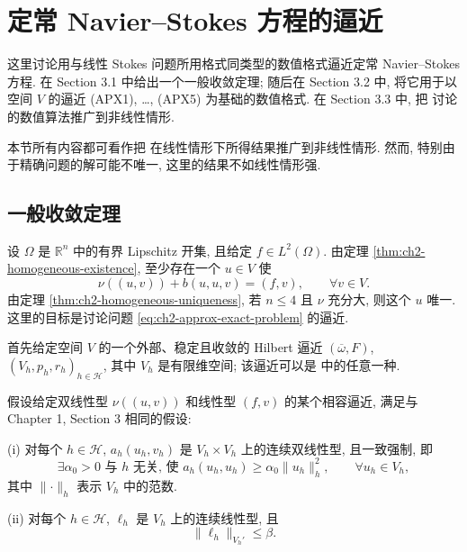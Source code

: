 \hypertarget{chapter-02-page-149}{}
\section{定常 Navier--Stokes 方程的逼近}
\label{sec:ch2-stationary-approximation}

这里讨论用与线性 Stokes 问题所用格式同类型的数值格式逼近定常 Navier--Stokes 方程. 在 Section 3.1 中给出一个一般收敛定理; 随后在 Section 3.2 中, 将它用于以空间 $V$ 的逼近 (APX1), \ldots, (APX5) 为基础的数值格式. 在 Section 3.3 中, 把  讨论的数值算法推广到非线性情形.

本节所有内容都可看作把  在线性情形下所得结果推广到非线性情形. 然而, 特别由于精确问题的解可能不唯一, 这里的结果不如线性情形强.

\subsection{一般收敛定理}
\label{subsec:ch2-general-convergence}

设 $\Omega$ 是 $\mathbb R^n$ 中的有界 Lipschitz 开集, 且给定 $f\in L^2(\Omega)$. 由定理 \ref{thm:ch2-homogeneous-existence}, 至少存在一个 $u\in V$ 使
\begin{equation}
\nu((u,v))+b(u,u,v)=(f,v),\qquad\forall v\in V.
\label{eq:ch2-approx-exact-problem}
\end{equation}
由定理 \ref{thm:ch2-homogeneous-uniqueness}, 若 $n\leq4$ 且 $\nu$ 充分大, 则这个 $u$ 唯一. 这里的目标是讨论问题 \eqref{eq:ch2-approx-exact-problem} 的逼近.

首先给定空间 $V$ 的一个外部、稳定且收敛的 Hilbert 逼近 $(\overline\omega,F)$, $(V_h,p_h,r_h)_{h\in\mathcal H}$, 其中 $V_h$ 是有限维空间; 该逼近可以是  中的任意一种.

假设给定双线性型 $\nu((u,v))$ 和线性型 $(f,v)$ 的某个相容逼近, 满足与 Chapter 1, Section 3 相同的假设:

(i) 对每个 $h\in\mathcal H$, $a_h(u_h,v_h)$ 是 $V_h\times V_h$ 上的连续双线性型, 且一致强制, 即
\begin{equation}
\exists\alpha_0>0\text{ 与 }h\text{ 无关, 使 }
a_h(u_h,u_h)\geq\alpha_0\lVert u_h\rVert_h^2,
\qquad\forall u_h\in V_h,
\label{eq:ch2-approx-uniform-coercivity}
\end{equation}
其中 $\lVert\cdot\rVert_h$ 表示 $V_h$ 中的范数.

(ii) 对每个 $h\in\mathcal H$, $\ell_h$ 是 $V_h$ 上的连续线性型, 且
\begin{equation}
\lVert\ell_h\rVert_{V_h'}\leq\beta.
\label{eq:ch2-approx-load-bound}
\end{equation}

